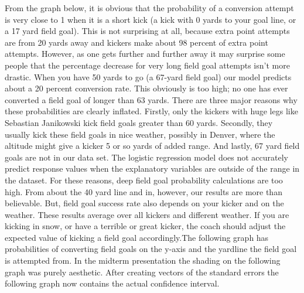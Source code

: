 \documentclass[letterpaper,10pt,english]{/anaconda/lib/python2.7/site-packages/sphinx/texinputs/sphinxhowto}
\begin{document}
From the graph below, it is obvious that the probability of a conversion
attempt is very close to 1 when it is a short kick (a kick with 0 yards
to your goal line, or a 17 yard field goal). This is not surprising at
all, because extra point attempts are from 20 yards away and kickers
make about 98 percent of extra point attempts. However, as one gets
further and further away it may surprise some people that the percentage
decrease for very long field goal attempts isn't more drastic. When you
have 50 yards to go (a 67-yard field goal) our model predicts about a 20
percent conversion rate. This obviously is too high; no one has ever
converted a field goal of longer than 63 yards. There are three major
reasons why these probabilities are clearly inflated. Firstly, only the
kickers with huge legs like Sebastian Janikowski kick field goals
greater than 60 yards. Secondly, they usually kick these field goals in
nice weather, possibly in Denver, where the altitude might give a kicker
5 or so yards of added range. And lastly, 67 yard field goals are not in
our data set. The logistic regression model does not accurately predict
response values when the explanatory variables are outside of the range
in the dataset. For these reasons, deep field goal probability
calculations are too high. From about the 40 yard line and in, however,
our results are more than believable. But, field goal success rate also
depends on your kicker and on the weather. These results average over
all kickers and different weather. If you are kicking in snow, or have a
terrible or great kicker, the coach should adjust the expected value of
kicking a field goal accordingly.The following graph has probabilities of converting field goals on the
y-axis and the yardline the field goal is attempted from. In the midterm
presentation the shading on the following graph was purely aesthetic.
After creating vectors of the standard errors the following graph now
contains the actual confidence interval.

    

        
        

            
\end{document}
